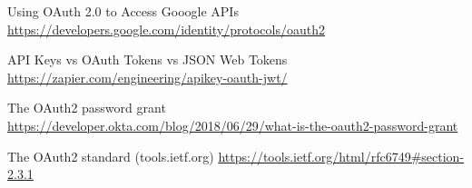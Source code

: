 \begin{thebibliography}{9}
    Using OAuth 2.0 to Access Gooogle APIs
    \\
    \url{https://developers.google.com/identity/protocols/oauth2}

    API Keys vs OAuth Tokens vs JSON Web Tokens
    \\
    \url{https://zapier.com/engineering/apikey-oauth-jwt/}

    The OAuth2 password grant
    \\
    \url{https://developer.okta.com/blog/2018/06/29/what-is-the-oauth2-password-grant}

    The OAuth2 standard (tools.ietf.org)
    \url{https://tools.ietf.org/html/rfc6749#section-2.3.1}
\end{thebibliography}
